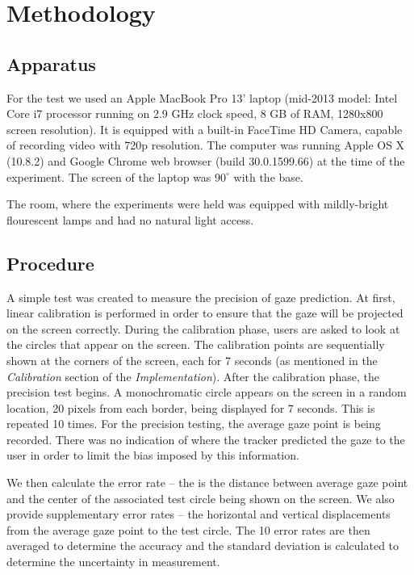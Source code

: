 \documentclass[annual]{acmsiggraph}
\begin{document}
\section{Methodology}

\subsection{Apparatus}

For the test we used an Apple MacBook Pro 13' laptop (mid-2013 model: Intel
Core i7 processor running on 2.9 GHz clock speed, 8 GB of RAM, 1280x800 screen
resolution).  It is equipped with a built-in FaceTime HD Camera, capable of
recording video with 720p resolution. The computer was running Apple OS X
(10.8.2) and Google Chrome web browser (build 30.0.1599.66) at the time of the
experiment. The screen of the laptop was $90^{\circ}$ with the base.

The room, where the experiments were held was equipped with mildly-bright
flourescent lamps and had no natural light access. 

\subsection{Procedure}

A simple test was created to measure the precision of gaze prediction. At
first, linear calibration is performed in order to ensure that the gaze will be
projected on the screen correctly. During the calibration phase, users are
asked to look at the circles that appear on the screen. The calibration points
are sequentially shown at the corners of the screen, each for 7 seconds (as
mentioned in the \emph{Calibration} section of the \emph{Implementation}).
After the calibration phase, the precision test begins. A monochromatic circle
appears on the screen in a random location, 20 pixels from each border, being
displayed for 7 seconds.  This is repeated 10 times. For the precision testing,
the average gaze point is being recorded.  There was no indication of where the
tracker predicted the gaze to the user in order to limit the bias imposed by
this information.

We then calculate the error rate -- the is the distance between average gaze
point and the center of the associated test circle being shown on the screen.
We also provide supplementary error rates -- the horizontal and vertical
displacements from the average gaze point to the test circle. The 10 error
rates are then averaged to determine the accuracy and the standard deviation is
calculated to determine the uncertainty in measurement.
\end{document}
